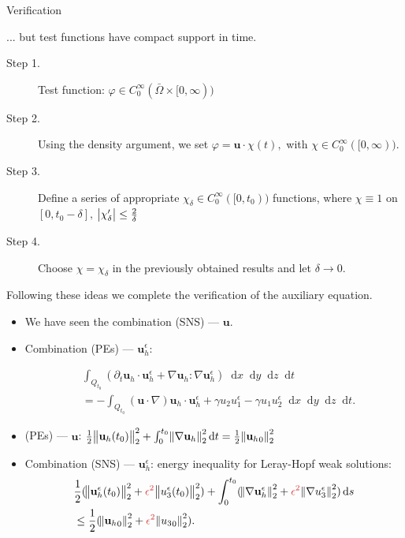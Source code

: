 \documentclass{beamer}
\newcommand*\diff{\mathop{}\!\mathrm{d}}
\begin{document}
\begin{frame}{Verification}

... but test functions have compact support in time.
\begin{description}
\item[Step 1.] Test function: $\varphi \in C_0^\infty (\bar{\Omega} \times [0, \infty))$
\item[Step 2.] Using the density argument, we set $\varphi = \mathbf{u} \cdot \chi(t),$ with $\chi \in C_0^\infty ([0, \infty)).$
\item[Step 3.] Define a series of appropriate $\chi_\delta \in C_0^\infty ([0, t_0))$ functions, where $\chi \equiv 1$ on $[0, t_0- \delta],$ $\abs{\chi_\delta'} \leq \frac{2}{\delta}$
\item[Step 4.] Choose $\chi = \chi_\delta$ in the previously obtained results and let $\delta \to 0.$
\end{description}

Following these ideas we complete the verification of the auxiliary equation.
\end{frame}

\begin{frame}
\begin{itemize}

\item We have seen the combination (SNS) --- $\mathbf{u}$.

\item Combination (PEs) --- $\mathbf{u}_h^\epsilon$:
  
  \begin{equation} \nonumber
    \begin{split}
      & \int_{Q_{t_0}} (\partial_t \mathbf{u}_h \cdot \mathbf{u}_h^\epsilon + \nabla \mathbf{u}_h : \nabla \mathbf{u}_h^\epsilon) \diff x \diff y \diff z \diff t \\
      & = - \int_{Q_{t_0}} (\mathbf{u} \cdot \nabla) \mathbf{u}_h \cdot \mathbf{u}_h^\epsilon + \gamma u_2 u_1^\epsilon - \gamma u_1 u_2^\epsilon \diff x \diff y \diff z \diff t.
    \end{split}
  \end{equation}
  
\item (PEs) --- $\mathbf{u}$: $\frac{1}{2} \norm{\mathbf{u}_h(t_0)}_2^2 + \int_0^{t_0} \norm{\nabla \mathbf{u}_h}_2^2 \diff t = \frac{1}{2} \norm{{\mathbf{u}_h}_0}_2^2$
\item Combination (SNS) --- $\mathbf{u}_h^\epsilon$: energy inequality for Leray-Hopf weak solutions:
\begin{equation} \nonumber
\begin{split}
& \frac{1}{2}( \norm{\mathbf{u}_h^\epsilon (t_0)}_2^2 + \textcolor{jasper}{\epsilon^2} \norm{u_3^\epsilon(t_0)}_2^2)+ \int_0^{t_0} (\norm{\nabla \mathbf{u}_h^\epsilon}_2^2 + \textcolor{jasper}{\epsilon^2} \norm{\nabla u_3^\epsilon}_2^2) \diff s \\
& \leq \frac{1}{2} (\norm{{\mathbf{u}_h}_0}_2^2 + \textcolor{jasper}{\epsilon^2} \norm{{u_3}_0}_2^2).
\end{split}
\end{equation}
\end{itemize}
\end{frame}
\end{document}
